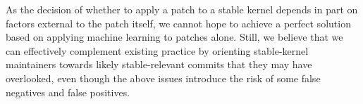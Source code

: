 As the decision of whether to apply a patch to a stable kernel depends in part
on factors external to the patch itself, we cannot hope to achieve a perfect solution
based on applying machine learning to patches alone. 
Still, we believe that we can effectively
complement existing practice by orienting stable-kernel maintainers towards
likely stable-relevant commits that they may have overlooked, even though
the above issues introduce the risk of some false negatives and false positives.

